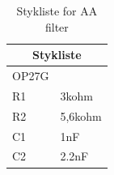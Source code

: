 \begin{table}[H]
\centering
\caption{Stykliste for AA filter}
\label{Styklisteaafilter}
\begin{tabular}{|l|l|}
\hline
\multicolumn{2}{|c|}{\textbf{Stykliste}} \\ \hline
OP27G             &                    \\ \hline
R1             &         3kohm  			\\ \hline
R2             &           5,6kohm         \\ \hline
C1             &           1nF         \\ \hline
C2             &           2.2nF         \\ \hline

\end{tabular}
\end{table}

%
%
%
%
%
	
	
	

